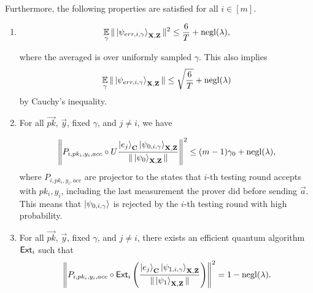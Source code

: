 \begin{lemma}
	Furthermore, the following properties are satisfied for all $i\in[m]$.
	\begin{enumerate}
		\item \label{property:partition-err}  $$\operatorname*{\mathbb{E}}_{\gamma}\|\ket{\psi_{err,i,\gamma}}_{\mathbf{X},\mathbf{Z}}\|^2 \leq \frac{6}{T}+\operatorname{negl}(\lambda),$$

			where the averaged is over uniformly sampled $\gamma$. This also implies
			\begin{align}
				\operatorname*{\mathbb{E}}_{\gamma}\|\ket{\psi_{err,i,\gamma}}_{\mathbf{X},\mathbf{Z}}\| \leq \sqrt{\frac{6}{T}}+\operatorname{negl}(\lambda)
			\end{align}
			by Cauchy's inequality.

		\item \label{property:partition-testing}
			For all $\vec{pk}$, $\vec{y}$, fixed $\gamma$, and  $j\neq i$, we have


			\begin{align}
				\left\lVert P_{i,pk_i,y_i,acc} \circ U\frac{\ket{e_j}_{\mathbf{C}}\ket{\psi_{0,i,\gamma}}_{\mathbf{X},\mathbf{Z}}}{\|\ket{\psi_0}_{\mathbf{X},\mathbf{Z}}\|}\right\rVert^2 \leq (m-1)\gamma_0+\operatorname{negl}(\lambda),
			\end{align}
			where $P_{i,pk_i,y_i,acc}$ are projector to the states that $i$-th testing round accepts with $pk_i,y_i$, including the last measurement the prover did before sending $\vec{a}$.  This means that $\ket{\psi_{0,i,\gamma}}$ is rejected by the $i$-th testing round with high probability.
		\item \label{property:partition-binding}
			For all $\vec{pk}$, $\vec{y}$, fixed $\gamma$, and $j\neq i$, there exists an efficient quantum algorithm $\mathsf{Ext}_i$ such that
			\begin{align}
				\left\lVert P_{i,pk_i,y_i,acc} \circ \mathsf{Ext}_i\left(\frac{\ket{e_j}_{\mathbf{C}}\ket{\psi_{1,i,\gamma}}_{\mathbf{X},\mathbf{Z}}}{\|\ket{\psi_1}_{\mathbf{X},\mathbf{Z}}\|}\right)\right\rVert^2 =1-\operatorname{negl}(\lambda).
			\end{align}


\end{enumerate}
\end{lemma}
